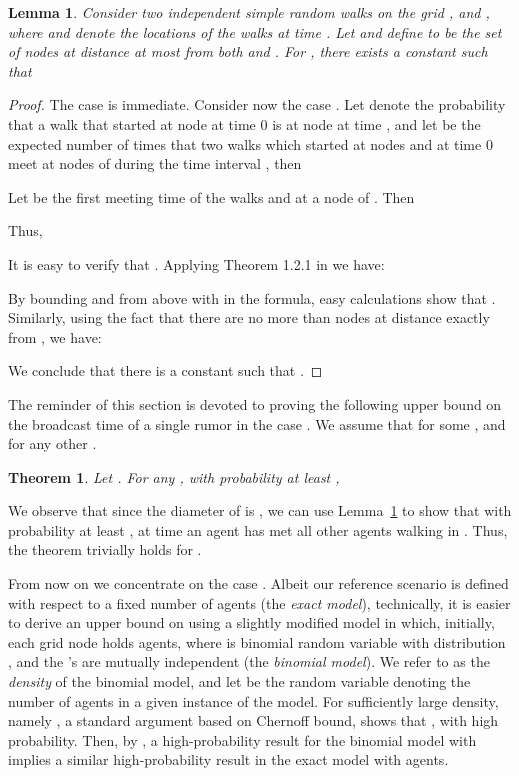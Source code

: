 \documentclass[11pt]{article}
\newcommand{\newterm}[1]{\emph{#1}}
\newtheorem{theo}{Theorem}
\newtheorem{lemm}{Lemma}
\begin{document}
\begin{lemm}
\label{lemm:MeetingProbability}
Consider two independent simple random walks on the grid
, and ,
where  and  denote the locations of the walks at time .
Let  and define  to be the set of nodes at
distance at most  from both  and .
For , there exists a constant  such that

\end{lemm}
\begin{proof}
The case  is immediate. Consider now the case .  Let  denote the probability that a walk that started at node  at
time 0 is at node  at time , and let  be
the expected number of times that two walks which started at nodes 
and  at time 0 meet at nodes of  during the time
interval , then

Let  be the first meeting time of the walks  and
 at a node of . Then

Thus, 

It is easy to verify that .
Applying Theorem 1.2.1 in \cite{Lawler91} we have:

By bounding  and  from above with 
in the formula, easy calculations show that .  Similarly, using the fact that there are no more than
 nodes at distance exactly  from , we have:


We conclude that there is a constant  such that
.\qedhere
\end{proof}

The reminder of this section is devoted to proving the following upper
bound on the broadcast time of a single rumor  in the case .
We assume that   for some ,
and  for any other .
\begin{theo}
\label{theo:UBSpreadingTime2}
Let . For any , with probability at least ,

\end{theo}

We observe that since the diameter of  is ,
we can use Lemma~\ref{lemm:MeetingProbability} to show that
with probability at least , at time 
an agent  has met all other agents walking   in .
Thus, the theorem trivially holds for .

From now on we concentrate on the case .
	\iffalse
	Albeit our reference scenario is defined with respect to a fixed number 
	of agents (the \newterm{exact model}), technically, it is easier to
	derive an upper bound on  using a slightly modified model in
	which, initially, each grid node  holds  agents, where 
	is binomial random variable with distribution , and the
	's are mutually independent (the \newterm{binomial model}). We
	refer to  as the \newterm{density} of the binomial
	model, and let  be the random variable
	denoting the number of agents in a given instance of the model.  For
	sufficiently large density, namely , a standard
	argument based on Chernoff bound, shows that ,
	with high probability.  Then, by
	\cite[Corollary~5.9]{MitzenmacherU05}, a high-probability result for
	the binomial model with  implies a similar
	high-probability result in the exact model with  agents.
	
\end{document}
